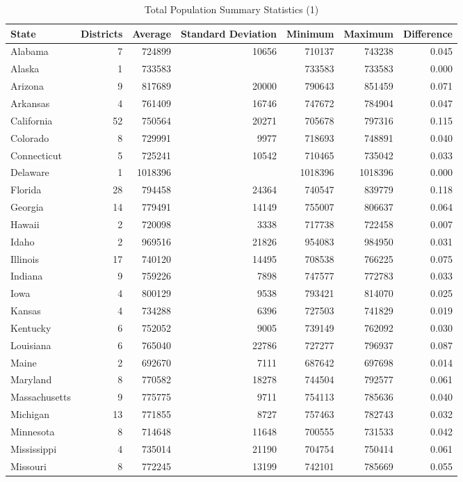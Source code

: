 \documentclass[12pt]{article}
\begin{document}
\begin{table}[ht!]
	\begin{tabular}{lrrrrrr}
	  \hline
	 State & Districts & Average  & Standard Deviation & Minimum & Maximum & Difference \\ 
	  \hline
	 Alabama & 7 & 724899 & 10656 & 710137 & 743238 & 0.045 \\ 
	   Alaska & 1 & 733583 &  & 733583 & 733583 & 0.000 \\ 
	  Arizona & 9 & 817689 & 20000 & 790643 & 851459 & 0.071 \\ 
	   Arkansas & 4 & 761409 & 16746 & 747672 & 784904 & 0.047 \\ 
	   California & 52 & 750564 & 20271 & 705678 & 797316 & 0.115 \\ 
	   Colorado & 8 & 729991 & 9977 & 718693 & 748891 & 0.040 \\ 
	  Connecticut & 5 & 725241 & 10542 & 710465 & 735042 & 0.033 \\ 
	  Delaware & 1 & 1018396 &  & 1018396 & 1018396 & 0.000 \\ 
	  Florida & 28 & 794458 & 24364 & 740547 & 839779 & 0.118 \\ 
	   Georgia & 14 & 779491 & 14149 & 755007 & 806637 & 0.064 \\ 
	   Hawaii & 2 & 720098 & 3338 & 717738 & 722458 & 0.007 \\ 
	   Idaho & 2 & 969516 & 21826 & 954083 & 984950 & 0.031 \\ 
	   Illinois & 17 & 740120 & 14495 & 708538 & 766225 & 0.075 \\ 
	  Indiana & 9 & 759226 & 7898 & 747577 & 772783 & 0.033 \\ 
	   Iowa & 4 & 800129 & 9538 & 793421 & 814070 & 0.025 \\ 
	   Kansas & 4 & 734288 & 6396 & 727503 & 741829 & 0.019 \\ 
	   Kentucky & 6 & 752052 & 9005 & 739149 & 762092 & 0.030 \\ 
	  Louisiana & 6 & 765040 & 22786 & 727277 & 796937 & 0.087 \\ 
	   Maine & 2 & 692670 & 7111 & 687642 & 697698 & 0.014 \\ 
	 Maryland & 8 & 770582 & 18278 & 744504 & 792577 & 0.061 \\ 
	   Massachusetts & 9 & 775775 & 9711 & 754113 & 785636 & 0.040 \\ 
	   Michigan & 13 & 771855 & 8727 & 757463 & 782743 & 0.032 \\ 
	 Minnesota & 8 & 714648 & 11648 & 700555 & 731533 & 0.042 \\ 
	 Mississippi & 4 & 735014 & 21190 & 704754 & 750414 & 0.061 \\ 
	 Missouri & 8 & 772245 & 13199 & 742101 & 785669 & 0.055 \\ 
	   
	   \hline
	\end{tabular}
	\label{total_pop_stats1}
	\caption{Total Population Summary Statistics (1)}
	\end{table}
\end{document}
